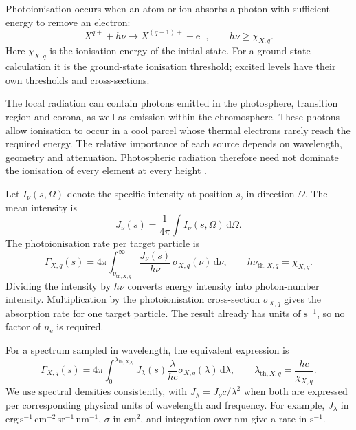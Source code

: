 Photoionisation occurs when an atom or ion absorbs a photon with sufficient
energy to remove an electron:
\begin{equation}
 X^{q+}+h\nu
 \longrightarrow X^{(q+1)+}+\mathrm e^-,
 \qquad h\nu\geq\chi_{X,q}.
 \label{eq:ion_photo_reaction}
\end{equation}
Here \(\chi_{X,q}\) is the ionisation energy of the initial state.
For a ground-state calculation it is the ground-state ionisation threshold;
excited levels have their own thresholds and cross-sections.

The local radiation can contain photons emitted in the photosphere,
transition region and corona, as well as emission within the chromosphere.
These photons allow ionisation to occur in a cool parcel whose thermal
electrons rarely reach the required energy. The relative importance of each
source depends on wavelength, geometry and attenuation. Photospheric radiation
therefore need not dominate the ionisation of every element at every height
\cite{laming2015,dufresne2021}.

Let \(I_\nu(s,\Omega)\) denote the specific intensity at position \(s\), in
direction \(\Omega\). The mean intensity is
\begin{equation}
 J_\nu(s)=\frac{1}{4\pi}\int I_\nu(s,\Omega)\,\mathrm d\Omega.
 \label{eq:ion_mean_intensity}
\end{equation}
The photoionisation rate per target particle is
\begin{equation}
 \Gamma_{X,q}(s)
 =4\pi\int_{\nu_{\mathrm{th},X,q}}^\infty
 \frac{J_\nu(s)}{h\nu}\,
 \sigma_{X,q}(\nu)\,\mathrm d\nu,
 \qquad
 h\nu_{\mathrm{th},X,q}=\chi_{X,q}.
 \label{eq:ion_photo_frequency}
\end{equation}
Dividing the intensity by \(h\nu\) converts energy intensity into photon-number
intensity. Multiplication by the photoionisation cross-section
\(\sigma_{X,q}\) gives the absorption rate for one target particle.
The result already has units of \(\mathrm{s^{-1}}\), so no factor of
\(n_{\mathrm e}\) is required.

For a spectrum sampled in wavelength, the equivalent expression is
\begin{equation}
 \Gamma_{X,q}(s)
 =4\pi\int_0^{\lambda_{\mathrm{th},X,q}}
 J_\lambda(s)\frac{\lambda}{hc}
 \sigma_{X,q}(\lambda)\,\mathrm d\lambda,
 \qquad
 \lambda_{\mathrm{th},X,q}=\frac{hc}{\chi_{X,q}}.
 \label{eq:ion_photo_wavelength}
\end{equation}
We use spectral densities consistently, with
\(J_\lambda=J_\nu c/\lambda^2\) when both are expressed per corresponding
physical units of wavelength and frequency. For example,
\(J_\lambda\) in
\(\mathrm{erg\,s^{-1}\,cm^{-2}\,sr^{-1}\,nm^{-1}}\),
\(\sigma\) in \(\mathrm{cm^2}\), and integration over nm give a rate in
\(\mathrm{s^{-1}}\).

